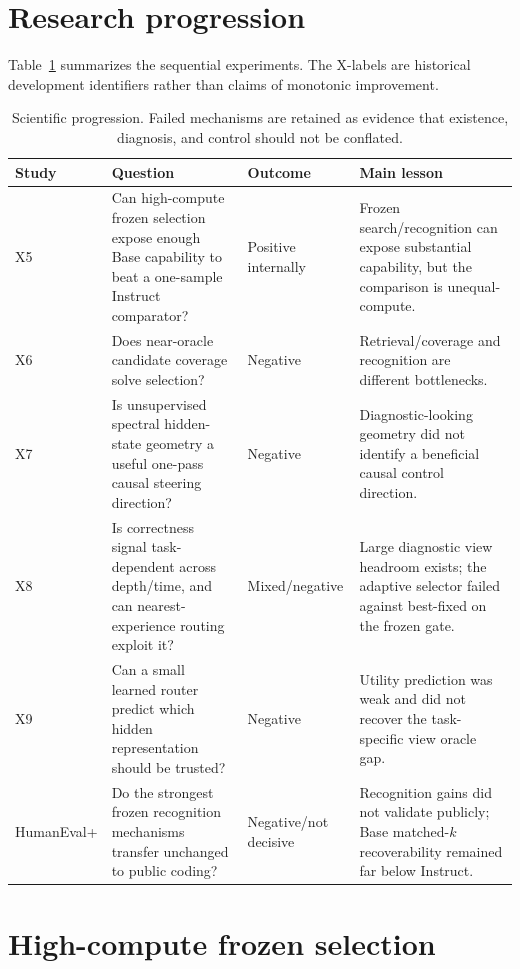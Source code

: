 \documentclass[11pt]{article}
\begin{document}
\section{Research progression}

Table~\ref{tab:progression} summarizes the sequential experiments. The X-labels are historical development identifiers rather than claims of monotonic improvement.

\begin{table}[t]
\centering
\small
\begin{tabular}{p{1.2cm}p{4.2cm}p{3.7cm}p{5.3cm}}
\toprule
Study & Question & Outcome & Main lesson \\
\midrule
X5 & Can high-compute frozen selection expose enough Base capability to beat a one-sample Instruct comparator? & Positive internally & Frozen search/recognition can expose substantial capability, but the comparison is unequal-compute. \\
X6 & Does near-oracle candidate coverage solve selection? & Negative & Retrieval/coverage and recognition are different bottlenecks. \\
X7 & Is unsupervised spectral hidden-state geometry a useful one-pass causal steering direction? & Negative & Diagnostic-looking geometry did not identify a beneficial causal control direction. \\
X8 & Is correctness signal task-dependent across depth/time, and can nearest-experience routing exploit it? & Mixed/negative & Large diagnostic view headroom exists; the adaptive selector failed against best-fixed on the frozen gate. \\
X9 & Can a small learned router predict which hidden representation should be trusted? & Negative & Utility prediction was weak and did not recover the task-specific view oracle gap. \\
HumanEval+ & Do the strongest frozen recognition mechanisms transfer unchanged to public coding? & Negative/not decisive & Recognition gains did not validate publicly; Base matched-$k$ recoverability remained far below Instruct. \\
\bottomrule
\end{tabular}
\caption{Scientific progression. Failed mechanisms are retained as evidence that existence, diagnosis, and control should not be conflated.}
\label{tab:progression}
\end{table}

\section{High-compute frozen selection}
\end{document}
